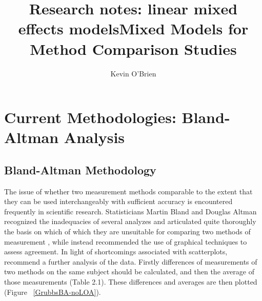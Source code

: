 \documentclass[12pt, a4paper]{report}
\title{Research notes: linear mixed effects models}
\author{ } \date{ }
\theoremstyle{plain}
\theoremstyle{definition}
\theoremstyle{remark}
\begin{document}
	\author{Kevin O'Brien}
	\title{Mixed Models for Method Comparison Studies}
	\tableofcontents
	
	\newpage
	\chapter{Current Methodologies: Bland-Altman Analysis}
	\section{Bland-Altman Methodology}
	
	The issue of whether two measurement methods comparable to the 	extent that they can be used interchangeably with sufficient accuracy is encountered frequently in scientific research. Statisticians Martin Bland and Douglas Altman recognized the inadequacies of several analyzes and articulated quite thoroughly the basis on which of which they are unsuitable for comparing two methods of measurement \citep*{BA83}, while instead recommended the use of graphical techniques to assess agreement.
	In light of shortcomings associated with scatterplots, \citet*{BA83} recommend a further analysis of the data. Firstly
differences of measurements of two methods on the same subject should  be calculated, and then the average of those measurements
(Table 2.1). These differences and averages are then plotted (Figure ~\ref{GrubbsBA-noLOA}).

		
\end{document}
